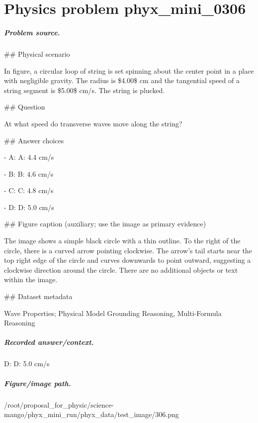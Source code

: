 
\chapter{Physics problem phyx\_mini\_0306}
\label{ch:PhyXMiniProblems_problem_phyx_mini_0306}

\paragraph{Problem source.}
\#\# Physical scenario

In figure, a circular loop of string is set spinning about the center point in a place with negligible gravity. The radius is \$4.00\$ cm and the tangential speed of a string segment is \$5.00\$ cm/s. The string is plucked.

\#\# Question

At what speed do transverse waves move along the string?

\#\# Answer choices

- A: A: 4.4 cm/s

- B: B: 4.6 cm/s

- C: C: 4.8 cm/s

- D: D: 5.0 cm/s

\#\# Figure caption (auxiliary; use the image as primary evidence)

The image shows a simple black circle with a thin outline. To the right of the circle, there is a curved arrow pointing clockwise. The arrow's tail starts near the top right edge of the circle and curves downwards to point outward, suggesting a clockwise direction around the circle. There are no additional objects or text within the image.

\#\# Dataset metadata

Wave Properties; Physical Model Grounding Reasoning, Multi-Formula Reasoning

\paragraph{Recorded answer/context.}
D: D: 5.0 cm/s

\paragraph{Figure/image path.}
/root/proposal\_for\_physic/science-mango/phyx\_mini\_run/phyx\_data/test\_image/306.png

